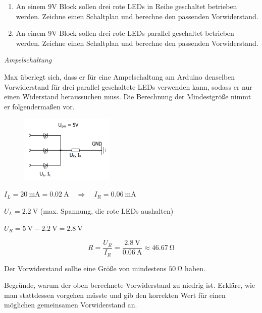 \begin{aufgabe}
	\begin{enumerate}[label=\alph*), itemsep=0ex, parsep=0ex]
		\item An einem 9V Block sollen drei rote LEDs in Reihe geschaltet betrieben werden. Zeichne einen Schaltplan und berechne den passenden Vorwiderstand.
		\item An einem 9V Block sollen drei rote LEDs parallel geschaltet betrieben werden. Zeichne einen Schaltplan und berechne den passenden Vorwiderstand.
	\end{enumerate} 
\end{aufgabe}
\vfill

\newpage

\begin{aufgabe} \emph{Ampelschaltung}
	
	Max überlegt sich, dass er für eine Ampelschaltung am Arduino denselben Vorwiderstand für drei parallel geschaltete LEDs verwenden kann, sodass er nur einen Widerstand heraussuchen muss. Die Berechnung der Mindestgröße nimmt er folgendermaßen vor.
	
	\begin{tcolorbox}[sharp corners, colframe= white]
		\begin{figure}
			\centering
			\vspace{-\baselineskip}
			\includegraphics[width=0.4\textwidth]{./Zeichnungen/schaltplan-rgb-led-berechnung.png}
		\end{figure}
		$I_L = \SI{20}{\milli\ampere} = \SI{0,02}{\ampere} \quad \Longrightarrow \quad I_R = \SI{0,06}{\milli\ampere}$
		
		$U_L = \SI{2,2}{\volt}$ \quad (max. Spannung, die rote LEDs aushalten)
		
		$U_R = \SI{5}{\volt} - \SI{2,2}{\volt} = \SI{2,8}{\volt}$
		
		\begin{equation*}
			R = \frac{U_R}{I_R} = \frac{\SI{2,8}{\volt}}{\SI{0,06}{\ampere}} \approx \SI{46,67}{\ohm}
		\end{equation*}
		
		\bigskip
		Der Vorwiderstand sollte eine Größe von mindestens $\SI{50}{\ohm}$ haben.
	\end{tcolorbox}
	
	
	\medskip
	Begründe, warum der oben berechnete Vorwiderstand zu niedrig ist. Erkläre, wie man stattdessen vorgehen müsste und gib den korrekten Wert für einen möglichen gemeinsamen Vorwiderstand an.
\end{aufgabe}

